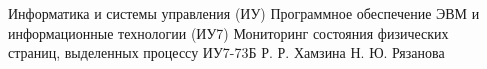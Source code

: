 \documentclass{bmstu}
\begin{document}
\makecourseworktitle
	{Информатика и системы управления (ИУ)}
	{Программное обеспечение ЭВМ и информационные технологии (ИУ7)}
	{Мониторинг состояния физических\\страниц, выделенных процессу}
	{ИУ7-73Б}
	{Р. Р. Хамзина}
	{Н. Ю. Рязанова}{}{}

\maketableofcontents








\makebibliography


\end{document}
